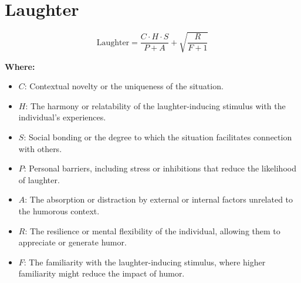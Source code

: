\chapter{Laughter}

\begin{equation}
\text{Laughter} = \frac{C \cdot H \cdot S}{P + A} + \sqrt{\frac{R}{F + 1}}
\end{equation}

\textbf{Where:}

\begin{itemize}
    \item $C$: Contextual novelty or the uniqueness of the situation.
    \item $H$: The harmony or relatability of the laughter-inducing stimulus with the individual's experiences.
    \item $S$: Social bonding or the degree to which the situation facilitates connection with others.
    \item $P$: Personal barriers, including stress or inhibitions that reduce the likelihood of laughter.
    \item $A$: The absorption or distraction by external or internal factors unrelated to the humorous context.
    \item $R$: The resilience or mental flexibility of the individual, allowing them to appreciate or generate humor.
    \item $F$: The familiarity with the laughter-inducing stimulus, where higher familiarity might reduce the impact of humor.
\end{itemize}